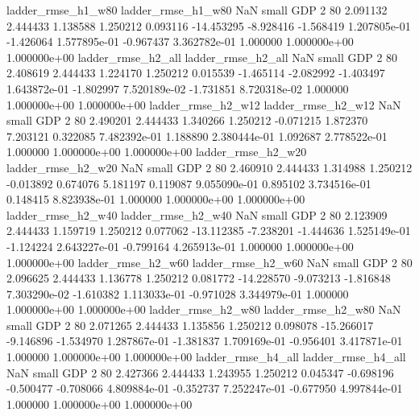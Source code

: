       ladder_rmse_h1_w80       ladder_rmse_h1_w80                   NaN      small      GDP                 2 80 2.091132       2.444433 1.138588       1.250212    0.093116    -14.453295     -8.928416    -1.568419   1.207805e-01 -1.426064 1.577895e-01    -0.967437   3.362782e-01            1.000000    1.000000e+00        1.000000e+00
      ladder_rmse_h2_all       ladder_rmse_h2_all                   NaN      small      GDP                 2 80 2.408619       2.444433 1.224170       1.250212    0.015539     -1.465114     -2.082992    -1.403497   1.643872e-01 -1.802997 7.520189e-02    -1.731851   8.720318e-02            1.000000    1.000000e+00        1.000000e+00
      ladder_rmse_h2_w12       ladder_rmse_h2_w12                   NaN      small      GDP                 2 80 2.490201       2.444433 1.340266       1.250212   -0.071215      1.872370      7.203121     0.322085   7.482392e-01  1.188890 2.380444e-01     1.092687   2.778522e-01            1.000000    1.000000e+00        1.000000e+00
      ladder_rmse_h2_w20       ladder_rmse_h2_w20                   NaN      small      GDP                 2 80 2.460910       2.444433 1.314988       1.250212   -0.013892      0.674076      5.181197     0.119087   9.055090e-01  0.895102 3.734516e-01     0.148415   8.823938e-01            1.000000    1.000000e+00        1.000000e+00
      ladder_rmse_h2_w40       ladder_rmse_h2_w40                   NaN      small      GDP                 2 80 2.123909       2.444433 1.159719       1.250212    0.077062    -13.112385     -7.238201    -1.444636   1.525149e-01 -1.124224 2.643227e-01    -0.799164   4.265913e-01            1.000000    1.000000e+00        1.000000e+00
      ladder_rmse_h2_w60       ladder_rmse_h2_w60                   NaN      small      GDP                 2 80 2.096625       2.444433 1.136778       1.250212    0.081772    -14.228570     -9.073213    -1.816848   7.303290e-02 -1.610382 1.113033e-01    -0.971028   3.344979e-01            1.000000    1.000000e+00        1.000000e+00
      ladder_rmse_h2_w80       ladder_rmse_h2_w80                   NaN      small      GDP                 2 80 2.071265       2.444433 1.135856       1.250212    0.098078    -15.266017     -9.146896    -1.534970   1.287867e-01 -1.381837 1.709169e-01    -0.956401   3.417871e-01            1.000000    1.000000e+00        1.000000e+00
      ladder_rmse_h4_all       ladder_rmse_h4_all                   NaN      small      GDP                 2 80 2.427366       2.444433 1.243955       1.250212    0.045347     -0.698196     -0.500477    -0.708066   4.809884e-01 -0.352737 7.252247e-01    -0.677950   4.997844e-01            1.000000    1.000000e+00        1.000000e+00
